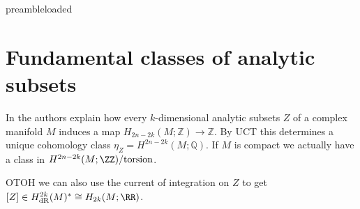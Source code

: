 %

\def\ifundefined#1{\expandafter\ifx\csname#1\endcsname\relax} \ifundefined{preambleloaded}
	 \else
	\typeout{\preambleloaded}
\fi

\usepackage[margin=3cm]{geometry}

\usepackage[size=scriptsize]{todonotes}

\usepackage{tgpagella}

\newcommand{\good}[1]{\textbf{\textcolor{green!70!black}{#1}}}
\newcommand{\bad}[1]{\textbf{\textcolor{red!90!black}{#1}}}
\newcommand{\bigthm}[1]{\textbf{\textcolor{Firebrick4}{#1}}}
\renewcommand{\demph}[1]{\textbf{\textcolor{orange}{#1}}}
\newcommand{\Gr}{\mathrm{Gr}}


\newcommand{\trans}{\pitchfork}
\DeclareMathOperator{\vol}{vol}
\DeclareMathOperator{\Aut}{Aut}
\DeclareMathOperator{\Pic}{Pic}


\section{Fundamental classes of analytic subsets}%
\label{sec:fundamental_classes_of_analytic_submanifolds}

In \cite[p.\ 61]{GH} the authors explain how every $k$-dimensional analytic subsets $Z$ of a complex manifold $M$ induces a map $H_{2n-2k}(M; \mathbb{Z}) \to \mathbb{Z}$. By UCT this determines a unique cohomology class $η_Z = H^{2n-2k}(M; \mathbb{Q})$. If $M$ is compact we actually have a class in $H^{2n-2k}(M; \ZZ) / \mathrm{torsion}$.

OTOH we can also use the current of integration on $Z$ to get $[Z] \in H^{2k}_\mathrm{dR}(M)^* \cong H_{2k}(M; \RR)$.

